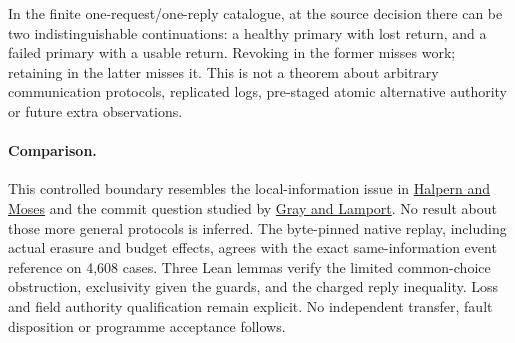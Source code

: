 \documentclass[11pt]{article}
\begin{document}
In the finite one-request/one-reply catalogue, at the source
decision there can be two indistinguishable continuations:
a healthy primary with lost return, and a failed primary with
a usable return. Revoking in the former misses work; retaining
in the latter misses it. This is not a theorem about arbitrary
communication protocols, replicated logs, pre-staged atomic
alternative authority or future extra observations.

\paragraph{Comparison.}
This controlled boundary resembles the local-information issue in
\href{https://arxiv.org/abs/cs/0006009}{Halpern and Moses}
and the commit question studied by
\href{https://www.microsoft.com/en-us/research/publication/consensus-on-transaction-commit/}
{Gray and Lamport}. No result about those more general protocols
is inferred. The byte-pinned native replay, including actual
erasure and budget effects, agrees with the exact same-information
event reference on 4,608 cases. Three Lean lemmas verify the
limited common-choice obstruction, exclusivity given the guards,
and the charged reply inequality. Loss and field authority
qualification remain explicit. No independent transfer, fault
disposition or programme acceptance follows.
\end{document}
